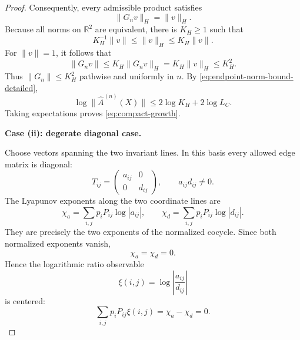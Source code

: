 \documentclass[11pt,a4paper]{amsart}
\theoremstyle{definition}
\theoremstyle{remark}
\numberwithin{equation}{section}
\newcommand{\RR}{\mathbb R}
\newcommand{\1}{\boldsymbol 1}
\begin{document}
\begin{proof}
Consequently, every admissible product satisfies
$$
 \|G_nv\|_H=\|v\|_H.
$$
Because all norms on $\RR^2$ are equivalent, there is $K_H\ge1$
such that
$$
 K_H^{-1}\|v\|\le\|v\|_H\le K_H\|v\|.
$$
For $\|v\|=1$, it follows that
$$
 \|G_nv\|
 \le K_H\|G_nv\|_H
 =K_H\|v\|_H
 \le K_H^2.
$$
Thus $\|G_n\|\le K_H^2$ pathwise and uniformly in $n$.  By
\eqref{eq:endpoint-norm-bound-detailed},
$$
 \log\|\widehat A^{(n)}(X)\|
 \le2\log K_H+2\log L_C.
$$
Taking expectations proves \eqref{eq:compact-growth}.

\medskip
\noindent
\textbf{Case (ii): degerate diagonal case.}

Choose vectors spanning the two invariant lines.  In this basis every
allowed edge matrix is diagonal:
$$
 T_{ij}=\begin{pmatrix}a_{ij}&0\\0&d_{ij}\end{pmatrix},
 \qquad a_{ij}d_{ij}\ne0.
$$
The Lyapunov exponents along the two coordinate lines are
$$
 \chi_a=\sum_{i,j}p_iP_{ij}\log|a_{ij}|,
 \qquad
 \chi_d=\sum_{i,j}p_iP_{ij}\log|d_{ij}|.
$$
They are precisely the two exponents of the normalized cocycle.  Since
both normalized exponents vanish,
$$
 \chi_a=\chi_d=0.
$$
Hence the logarithmic ratio observable
$$
 \xi(i,j)=\log\left|\frac{a_{ij}}{d_{ij}}\right|
$$
is centered:
\begin{equation}\label{eq:diagonal-ratio-centered-detailed}
 \sum_{i,j}p_iP_{ij}\xi(i,j)=\chi_a-\chi_d=0.
\end{equation}


\end{proof}
\end{document}
